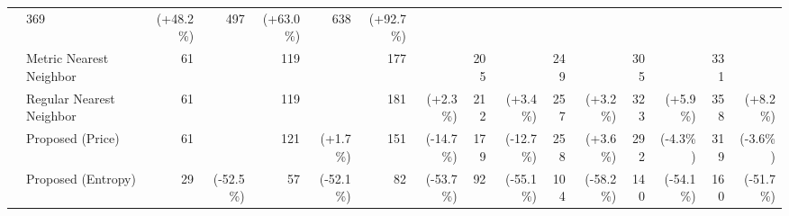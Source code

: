 \documentclass[onecolumn]{elsarticle}
\begin{document}
\begin{table}
{\begin{tabular}{l|l|r@{~}r|r@{~}r|r@{~}r|r@{~}r|r@{~}r|r@{~}r|r@{~}r|}
                                                    & 369  & {\color{red}(+48.2\%)} 
                                                    & 497  & {\color{red}(+63.0\%)} 
                                                    & 638  & {\color{red}(+92.7\%)}  \\
                                & \cellcolor{Gray}Metric Nearest Neighbor        
                                                    & \cellcolor{Gray}61 & \cellcolor{Gray}
                                                    & \cellcolor{Gray}119 & \cellcolor{Gray}
                                                    & \cellcolor{Gray}177 & \cellcolor{Gray}
                                                    & \cellcolor{Gray}205 & \cellcolor{Gray}
                                                    & \cellcolor{Gray}249 & \cellcolor{Gray}
                                                    & \cellcolor{Gray}305 & \cellcolor{Gray}
                                                    & \cellcolor{Gray}331 & \cellcolor{Gray}  \\
                                & Regular Nearest Neighbor       & 61 & 
                                                    & 119 & 
                                                    & 181 & {\color{red}(+2.3\%)}
                                                    & 212 & {\color{red}(+3.4\%)}
                                                    & 257 & {\color{red}(+3.2\%)}
                                                    & 323 & {\color{red}(+5.9\%)}
                                                    & 358 & {\color{red}(+8.2\%)}  \\
                                & Proposed (Price)   & 61 & 
                                                    & 121 & {\color{red}(+1.7\%)}
                                                    & 151 & {\color{green}(-14.7\%)}
                                                    & 179 & {\color{green}(-12.7\%)}
                                                    & 258 & {\color{green}(+3.6\%)}
                                                    & 292 & {\color{green}(-4.3\%)}
                                                    & 319 & {\color{green}(-3.6\%)}  \\
                                & Proposed (Entropy)& 29 & {\color{green}(-52.5\%)}
                                                    & 57 & {\color{green}(-52.1\%)}
                                                    & 82 & {\color{green}(-53.7\%)}
                                                    & 92 & {\color{green}(-55.1\%)}
                                                    & 104 & {\color{green}(-58.2\%)}
                                                    & 140 & {\color{green}(-54.1\%)}
                                                    & 160 & {\color{green}(-51.7\%)} \\ \hline 
      \end{tabular}
    }
\end{table}
\end{document}
